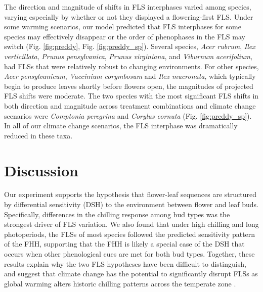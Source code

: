 \documentclass[11pt]{article}\usepackage[]{graphicx}\usepackage[]{color}
\begin{document}
\noindent The direction and magnitude of shifts in FLS interphases varied among species, varying especially by whether or not they displayed a flowering-first FLS. Under some warming scenarios, our model predicted that  FLS interphases for some species may effectively disappear or the order of phenophases in the FLS may switch (Fig. \ref{fig:preddy}, Fig. \ref{fig:preddy_sp}). Several species, \textit{Acer rubrum}, \textit{Ilex verticillata}, \textit{Prunus pensylvanica}, \textit{Prunus virginiana}, and \textit{Viburnum acerifolium}, had FLSs that were relatively robust to changing environments. For other species, \textit{Acer pensylvanicum}, \textit{Vaccinium corymbosum} and \textit{Ilex mucronata}, which typically begin to produce leaves shortly before flowers open, the magnitudes of projected FLS shifts were moderate. The two species with the most significant FLS shifts in both direction and magnitude across treatment combinations and climate change scenarios were \textit{Comptonia peregrina} and \textit{Corylus cornuta} (Fig. \ref{fig:preddy_sp}). In all of our climate change scenarios, the FLS interphase was dramatically reduced in these taxa.\\

\section*{Discussion}
\noindent Our experiment supports the hypothesis that flower-leaf sequences are structured by differential sensitivity (DSH) to the environment between flower and leaf buds. Specifically, differences in the chilling response among bud types was the strongest driver of FLS variation. We also found that under high chilling and long photoperiods, the FLSs of most species followed the predicted sensitivity pattern of the FHH, supporting that the FHH is likely a special case of the DSH that occurs when other phenological cues are met for both bud types. Together, these results explain why the two FLS hypotheses have been difficult to distinguish, and suggest that climate change has the potential to significantly disrupt FLSs as global warming alters historic chilling patterns across the temperate zone \citep{Morin:2009aa}. 
\end{document}
